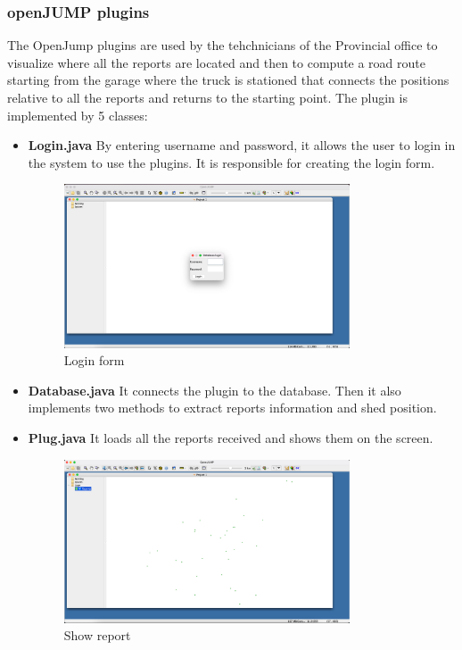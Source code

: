  \subsubsection{openJUMP plugins}
The OpenJump plugins are used by the tehchnicians of the Provincial office to visualize where all the reports are located and then to compute a road route starting from the garage where the truck is stationed that connects the positions relative to all the reports and returns to the
starting point.
The plugin is implemented by 5 classes:
\begin{itemize}
    \item\textbf{Login.java}
    By entering username and password, it allows the user to login in the system to use the plugins. It is responsible for creating the login form. 
     \begin{figure}[h]
        \centering
        \includegraphics[width=0.8\textwidth]{images/oj_login.png}
        \caption{Login form}
        \label{ER}
 \end{figure}


    \item\textbf{Database.java}
    It connects the plugin to the database. Then it also implements two methods to extract reports information and shed position.

    \item\textbf{Plug.java}
    It loads all the reports received and shows them on the screen.
    \begin{figure}[h]
        \centering
        \includegraphics[width=0.8\textwidth]{images/oj_layer.png}
        \caption{Show report}
        \label{ER}
 \end{figure}


\end{itemize}
